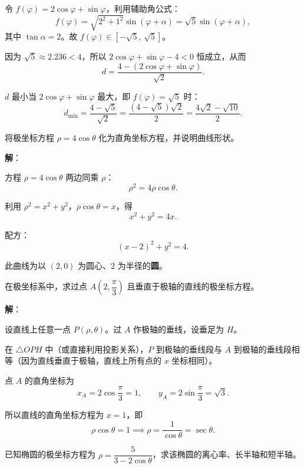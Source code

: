 \documentclass[12pt,a4paper]{ctexart}
\theoremstyle{definition}
\begin{document}
令 $f(\varphi) = 2\cos\varphi + \sin\varphi$，利用辅助角公式：
\[
  f(\varphi) = \sqrt{2^2+1^2}\sin(\varphi+\alpha) = \sqrt{5}\sin(\varphi+\alpha),
\]
其中 $\tan\alpha = 2$。故 $f(\varphi) \in [-\sqrt{5},\,\sqrt{5}]$。

因为 $\sqrt{5} \approx 2.236 < 4$，所以 $2\cos\varphi+\sin\varphi-4 < 0$ 恒成立，从而
\[
  d = \frac{4-(2\cos\varphi+\sin\varphi)}{\sqrt{2}}.
\]

$d$ 最小当 $2\cos\varphi+\sin\varphi$ 最大，即 $f(\varphi)=\sqrt{5}$ 时：
\[
  d_{\min} = \frac{4-\sqrt{5}}{\sqrt{2}} = \frac{(4-\sqrt{5})\sqrt{2}}{2} = \boxed{\frac{4\sqrt{2}-\sqrt{10}}{2}}.
\]

\begin{example}
  将极坐标方程 $\rho = 4\cos\theta$ 化为直角坐标方程，并说明曲线形状。
\end{example}

\textbf{解}：

方程 $\rho = 4\cos\theta$ 两边同乘 $\rho$：
\[
  \rho^2 = 4\rho\cos\theta.
\]

利用 $\rho^2=x^2+y^2$，$\rho\cos\theta = x$，得
\[
  x^2 + y^2 = 4x.
\]

配方：
\[
  (x-2)^2 + y^2 = 4.
\]

此曲线为以 $(2,0)$ 为圆心、$2$ 为半径的\textbf{圆}。

\begin{example}
  在极坐标系中，求过点 $A\!\left(2,\dfrac{\pi}{3}\right)$ 且垂直于极轴的直线的极坐标方程。
\end{example}

\textbf{解}：

设直线上任意一点 $P(\rho,\theta)$。过 $A$ 作极轴的垂线，设垂足为 $H$。

在 $\triangle OPH$ 中（或直接利用投影关系），$P$ 到极轴的垂线段与 $A$ 到极轴的垂线段相等（因为直线垂直于极轴，直线上所有点的 $x$ 坐标相同）。

点 $A$ 的直角坐标为
\[
  x_A = 2\cos\frac{\pi}{3} = 1,\qquad y_A = 2\sin\frac{\pi}{3} = \sqrt{3}.
\]

所以直线的直角坐标方程为 $x=1$，即
\[
  \rho\cos\theta = 1 \implies \boxed{\rho = \frac{1}{\cos\theta} = \sec\theta.}
\]

\begin{example}
  已知椭圆的极坐标方程为 $\rho = \dfrac{5}{3-2\cos\theta}$，求该椭圆的离心率、长半轴和短半轴。
\end{example}
\end{document}
